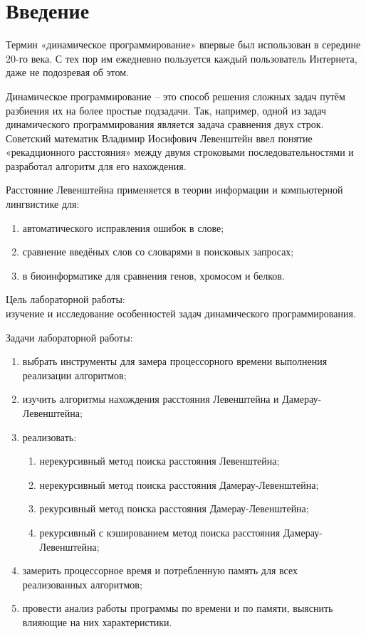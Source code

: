 \section*{\large Введение}
	Термин «динамическое программирование» впервые был использован в середине 20-го века. С тех пор им ежедневно пользуется каждый пользователь Интернета, даже не подозревая об этом.
	\par Динамическое программирование -- это способ решения сложных задач путём разбиения их на более простые подзадачи. Так, например, одной из задач динамического программирования является задача сравнения двух строк. Советский математик Владимир Иосифович Левенштейн ввел понятие «рекадционного расстояния» между двумя строковыми последовательностями и разработал алгоритм для его нахождения. 
	
	Расстояние Левенштейна применяется в теории информации и компьютерной лингвистике для:

	\begin{enumerate}
		\item автоматического исправления ошибок в слове;
		\item сравнение введёных слов со словарями в поисковых запросах;
		\item в биоинформатике для сравнения генов, хромосом и белков.
	\end{enumerate}

	Цель лабораторной работы:\\
	изучение и исследование особенностей задач динамического программирования.

	Задачи лабораторной работы:
	\begin{enumerate}
		\item выбрать инструменты для замера процессорного времени выполнения реализации алгоритмов;
		\item изучить алгоритмы нахождения расстояния Левенштейна и Дамерау-Левенштейна;
		\item реализовать:
		\begin{enumerate}
			\item нерекурсивный метод поиска расстояния Левенштейна;
			\item нерекурсивный метод поиска расстояния Дамерау-Левенштейна;
			\item рекурсивный метод поиска расстояния Дамерау-Левенштейна;
			\item рекурсивный с кэшированием метод поиска расстояния Дамерау-Левенштейна;
		\end{enumerate}
		\item замерить процессорное время и потребленную память для всех реализованных алгоритмов;
		\item провести анализ работы программы по времени и по памяти, выяснить влияющие на них характеристики.
	\end{enumerate}
\newpage